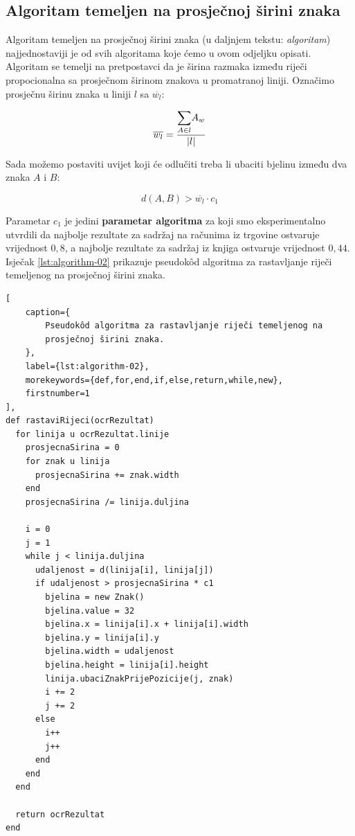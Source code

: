 \documentclass[times, utf8, zavrsni]{fer}
\begin{document}
\subsection{Algoritam temeljen na prosječnoj širini znaka}
\label{subsec:algoritam-temeljen-na-prosjecnoj-sirini znaka}
Algoritam temeljen na prosječnoj širini znaka (u daljnjem tekstu: \emph
{algoritam}) najjednostaviji je od svih algoritama koje ćemo u ovom odjeljku
opisati. Algoritam se temelji na pretpostavci da je širina razmaka između
riječi propocionalna sa prosječnom širinom znakova u promatranoj liniji.
Označimo prosječnu širinu znaka u liniji $l$ sa $\overline{w_l}$:

\begin{equation}
\overline{w_l} = \frac{\mathlarger{\sum}\limits_{A \in l} A_w}{|l|}
\end{equation}

Sada možemo postaviti uvijet koji će odlučiti treba li ubaciti bjelinu između
dva znaka $A$ i $B$:

\begin{equation}
\label{eq:condition-01}
d(A, B) > \overline{w_l} \cdot c_1
\end{equation}

Parametar $c_1$ je jedini \textbf{parametar algoritma} za koji smo
eksperimentalno utvrdili da najbolje rezultate za sadržaj na računima iz
trgovine ostvaruje vrijednost $0{,}8$, a najbolje rezultate za sadržaj iz knjiga
ostvaruje vrijednost $0{,}44$. Isječak \ref{lst:algorithm-02} prikazuje
pseudokôd algoritma za rastavljanje riječi temeljenog na prosječnoj širini
znaka.

\begin{lstlisting}[
    caption={
        Pseudokôd algoritma za rastavljanje riječi temeljenog na
        prosječnoj širini znaka.
    },
    label={lst:algorithm-02},
    morekeywords={def,for,end,if,else,return,while,new},
    firstnumber=1
],
def rastaviRijeci(ocrRezultat)
  for linija u ocrRezultat.linije
    prosjecnaSirina = 0
    for znak u linija
      prosjecnaSirina += znak.width
    end
    prosjecnaSirina /= linija.duljina

    i = 0
    j = 1
    while j < linija.duljina
      udaljenost = d(linija[i], linija[j])
      if udaljenost > prosjecnaSirina * c1
        bjelina = new Znak()
        bjelina.value = 32
        bjelina.x = linija[i].x + linija[i].width
        bjelina.y = linija[i].y
        bjelina.width = udaljenost
        bjelina.height = linija[i].height
        linija.ubaciZnakPrijePozicije(j, znak)
        i += 2
        j += 2
      else
        i++
        j++
      end
    end
  end

  return ocrRezultat
end
\end{lstlisting}
\end{document}
